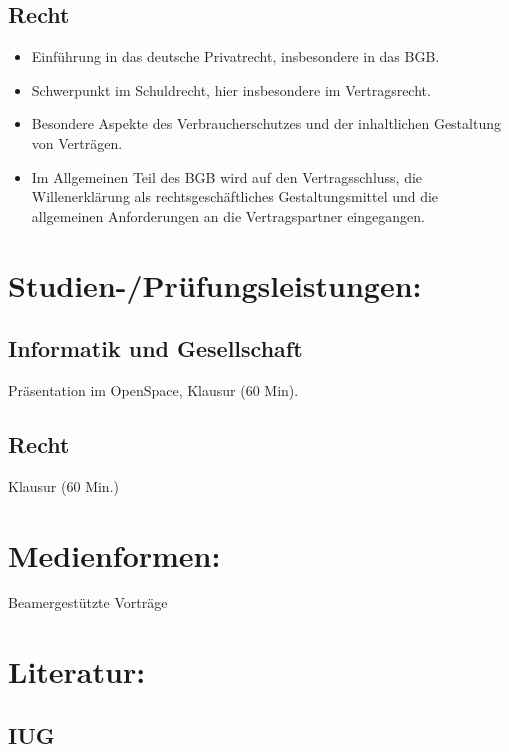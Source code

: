 \subsection*{Recht}\label{recht}

\begin{itemize}
\tightlist
\item
  Einführung in das deutsche Privatrecht, insbesondere in das BGB.
\item
  Schwerpunkt im Schuldrecht, hier insbesondere im Vertragsrecht.
\item
  Besondere Aspekte des Verbraucherschutzes und der inhaltlichen
  Gestaltung von Verträgen.
\item
  Im Allgemeinen Teil des BGB wird auf den Vertragsschluss, die
  Willenerklärung als rechtsgeschäftliches Gestaltungsmittel und die
  allgemeinen Anforderungen an die Vertragspartner eingegangen.
\end{itemize}

\section*{Studien-/Prüfungsleistungen:}\label{studien-pruxfcfungsleistungen-14}

\subsection*{Informatik und
Gesellschaft}\label{informatik-und-gesellschaft-1}

Präsentation im OpenSpace, Klausur (60 Min).

\subsection*{Recht}\label{recht-1}

Klausur (60 Min.)

\section*{Medienformen:}\label{medienformen-9}

Beamergestützte Vorträge

\section*{Literatur:}\label{literatur-13}

\subsection*{IUG}\label{iug}

